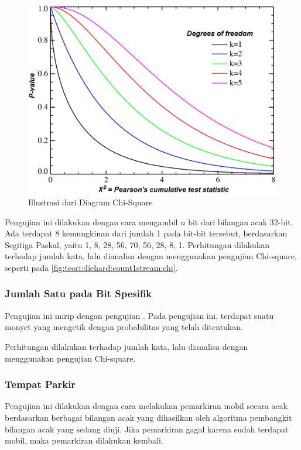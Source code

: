 \documentclass[conference]{IEEEtran}
\begin{document}
\begin{figure}[htbp]
    \includegraphics[width=\linewidth]{img/teori-diehard-count1stream-chi.png}
    \caption{Illustrasi dari Diagram Chi-Square}
    \label{fig:teori:diehard:count1stream:chi}
\end{figure}

Pengujian ini dilakukan dengan cara mengambil $n$ bit dari bilangan acak 32-bit.
Ada terdapat 8 kemungkinan dari jumlah 1 pada bit-bit tersebut, berdasarkan Segitiga Paskal, yaitu 1, 8, 28, 56, 70, 56, 28, 8, 1.
Perhitungan dilakukan terhadap jumlah kata, lalu dianalisa dengan menggunakan pengujian Chi-square, seperti pada \autoref{fig:teori:diehard:count1stream:chi}.

\subsubsection{Jumlah Satu pada Bit Spesifik}

Pengujian ini mirip dengan pengujian .
Pada pengujian ini, terdapat suatu monyet yang mengetik dengan probabilitas yang telah ditentukan.

Perhitungan dilakukan terhadap jumlah kata, lalu dianalisa dengan menggunakan pengujian Chi-square.

\subsubsection{Tempat Parkir}

Pengujian ini dilakukan dengan cara melakukan pemarkiran mobil secara acak berdasarkan berbagai bilangan acak yang dihasilkan oleh algoritma pembangkit bilangan acak yang sedang diuji.
Jika pemarkiran gagal karena sudah terdapat mobil, maka pemarkiran dilakukan kembali.
\end{document}
